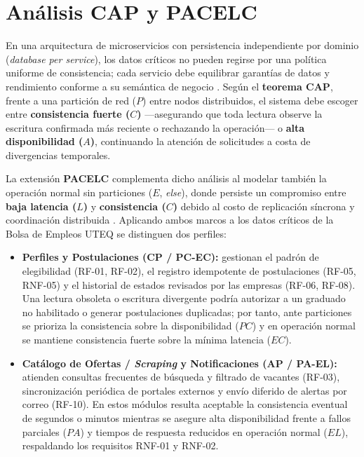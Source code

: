 \documentclass[11pt,a4paper]{article}
\begin{document}
\section{Análisis CAP y PACELC}

En una arquitectura de microservicios con persistencia independiente por dominio (\textit{database per service}), los datos críticos no pueden regirse por una política uniforme de consistencia; cada servicio debe equilibrar garantías de datos y rendimiento conforme a su semántica de negocio \cite{laigner2021}. Según el \textbf{teorema CAP}, frente a una partición de red ($P$) entre nodos distribuidos, el sistema debe escoger entre \textbf{consistencia fuerte ($C$)} —asegurando que toda lectura observe la escritura confirmada más reciente o rechazando la operación— o \textbf{alta disponibilidad ($A$)}, continuando la atención de solicitudes a costa de divergencias temporales.

La extensión \textbf{PACELC} complementa dicho análisis al modelar también la operación normal sin particiones ($E$, \textit{else}), donde persiste un compromiso entre \textbf{baja latencia ($L$)} y \textbf{consistencia ($C$)} debido al costo de replicación síncrona y coordinación distribuida \cite{laigner2021,blinowski2022}. Aplicando ambos marcos a los datos críticos de la Bolsa de Empleos UTEQ se distinguen dos perfiles:

\begin{itemize}
    \item \textbf{Perfiles y Postulaciones (CP / PC-EC):} gestionan el padrón de elegibilidad (RF-01, RF-02), el registro idempotente de postulaciones (RF-05, RNF-05) y el historial de estados revisados por las empresas (RF-06, RF-08). Una lectura obsoleta o escritura divergente podría autorizar a un graduado no habilitado o generar postulaciones duplicadas; por tanto, ante particiones se prioriza la consistencia sobre la disponibilidad ($PC$) y en operación normal se mantiene consistencia fuerte sobre la mínima latencia ($EC$).
    \item \textbf{Catálogo de Ofertas / \textit{Scraping} y Notificaciones (AP / PA-EL):} atienden consultas frecuentes de búsqueda y filtrado de vacantes (RF-03), sincronización periódica de portales externos y envío diferido de alertas por correo (RF-10). En estos módulos resulta aceptable la consistencia eventual de segundos o minutos mientras se asegure alta disponibilidad frente a fallos parciales ($PA$) y tiempos de respuesta reducidos en operación normal ($EL$), respaldando los requisitos RNF-01 y RNF-02.
\end{itemize}
\end{document}
